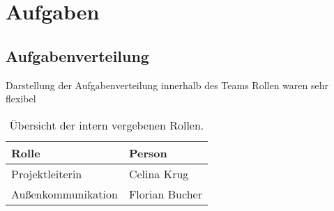 \chapter{Aufgaben}

\section{Aufgabenverteilung}

    Darstellung der Aufgabenverteilung innerhalb des Teams
    Rollen waren sehr flexibel

    \begin{table}[H]
        \centering
        \begin{tabularx}{\textwidth}{ | l | X | }
            \hline
                \textbf{Rolle} & \textbf{Person} \\
            \hline
                Projektleiterin & Celina Krug \\ 
            \hline
                Außenkommunikation & Florian Bucher \\ 
            \hline
        \end{tabularx}
        \caption{Übersicht der intern vergebenen Rollen.}
        \label{table:roles}
    \end{table}

